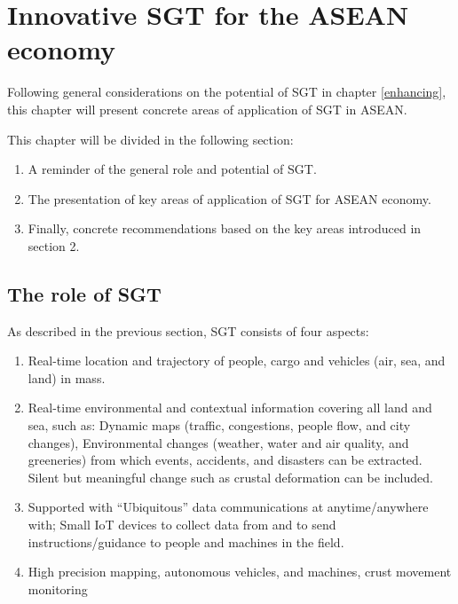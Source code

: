 \chapter{Innovative SGT for the ASEAN economy}


\tab Following general considerations on the potential of SGT in chapter \ref{enhancing}, this chapter will present concrete areas of application of SGT in ASEAN. 

\vspace{0.4 cm}

This chapter will be divided in the following section:

\begin{enumerate}

\item A reminder of the general role and potential of SGT.

\item The presentation of key areas of application of SGT for ASEAN economy.

\item Finally, concrete recommendations based on the key areas introduced in section 2.

\end{enumerate}


\section{The role of SGT}

\tab As described in the previous section, SGT consists of four aspects:

\begin{enumerate}

\item Real-time location and trajectory of people, cargo and vehicles (air, sea, and land) in mass.

\item Real-time environmental and contextual information covering all land and sea, such as: Dynamic maps (traffic, congestions, people flow, and city changes), Environmental changes (weather, water and air quality, and greeneries) from which events, accidents, and disasters can be extracted. Silent but meaningful change such as crustal deformation can be included.

\item Supported with “Ubiquitous” data communications at anytime/anywhere with; Small IoT devices to collect data from and to send instructions/guidance to people and machines in the field.

\item High precision mapping, autonomous vehicles, and machines, crust movement monitoring

\end{enumerate}

